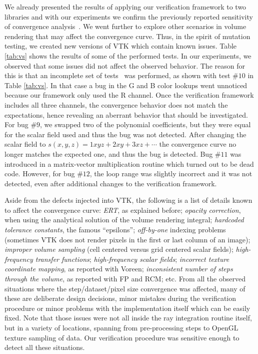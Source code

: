 We already presented the results of applying our verification
framework to two libraries and with our experiments we confirm the
previously reported sensitivity of convergence
analysis~\cite{Roy2005}. We went further to explore other scenarios in
volume rendering that may affect the convergence curve. Thus, in the
spirit of mutation testing, we created new versions of VTK which
contain known issues. Table \ref{tab:vs} shows the results of some of
the performed tests. In our experiments, we observed that some issues
did not affect the observed behavior.  The reason for this is that an
incomplete set of tests~\cite{KnuppSalari02} was performed, as shown
with test $\#10$ in Table \ref{tab:vs}. In that case a bug in the G
and B color lookups went unnoticed because our framework only used the
R channel. Once the verification framework includes all three
channels, the convergence behavior does not match the expectations, 
hence revealing an aberrant behavior that should be investigated. For bug $\#9$, we swapped two of the polynomial coefficients,
but they were equal for the scalar field used and thus the bug was not
detected. After changing the scalar field to $s(x,y,z) = 1xyz + 2xy +
3xz + \cdots$ the convergence curve no longer matches the expected one,
and thus the bug is detected. Bug $\#11$ was introduced in a
matrix-vector multiplication routine which turned out to be dead
code. However, for bug $\#12$, the loop range was slightly incorrect
and it was not detected, even after additional changes to the
verification framework.

Aside from the defects injected into VTK, the following is a list of
details known to affect the convergence curve:
\emph{ERT}, as explained before;
\emph{opacity correction}, when using the analytical solution of the volume rendering integral;
\emph{hardcoded tolerance constants}, the famous ``epsilons'';
\emph{off-by-one} indexing problems (sometimes VTK does not render pixels in the first or last
column of an image);
\emph{improper volume sampling} (cell centered versus grid centered
scalar fields);
\emph{high-frequency transfer functions};
\emph{high-frequency scalar fields};
\emph{incorrect texture coordinate mapping}, as reported with Voreen;
\emph{inconsistent number of steps through the volume}, as reported
with FP and RCM; etc. %
From all the observed situations where the step/dataset/pixel size
convergence was affected, many of these are deliberate design
decisions, minor mistakes during the verification procedure or minor
problems with the implementation itself which can be easily fixed.
%
Note that those issues were not all inside the ray integration routine
itself, but in a variety of locations, spanning from pre-processing
steps to OpenGL texture sampling of data.
Our verification procedure was sensitive enough to detect all these
situations. 

